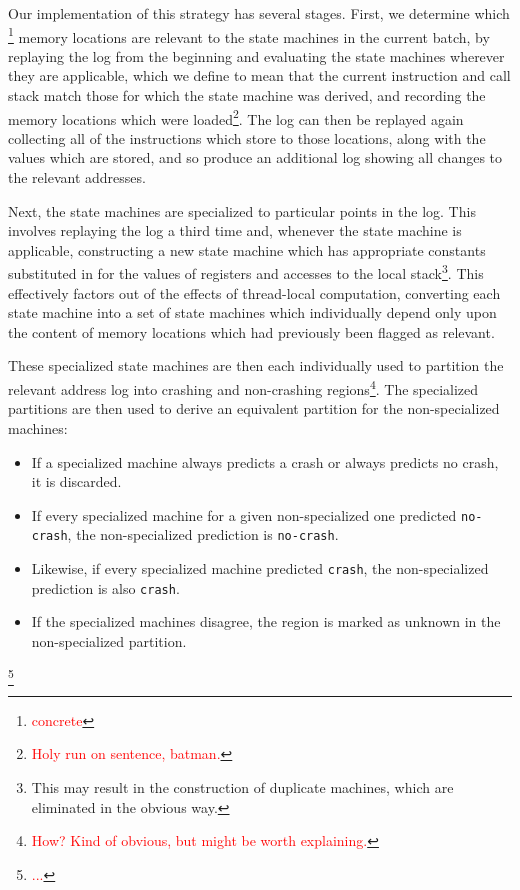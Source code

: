 \documentclass[10pt,twocolumn,preprint,natbib,authoryear]{sigplanconf}
\newcommand{\editorial}[1]{\textcolor{red}{\footnote{\textcolor{red}{#1}}}}
\begin{document}
Our implementation of this strategy has several stages.  First, we
determine which \editorial{concrete} memory locations are relevant to
the state machines in the current batch, by replaying the log from the
beginning and evaluating the state machines wherever they are
applicable, which we define to mean that the current instruction and
call stack match those for which the state machine was derived, and
recording the memory locations which were loaded\editorial{Holy run on
  sentence, batman.}.  The log can then be replayed again collecting
all of the instructions which store to those locations, along with the
values which are stored, and so produce an additional log showing all
changes to the relevant addresses.

Next, the state machines are specialized to particular points in the
log.  This involves replaying the log a third time and, whenever the
state machine is applicable, constructing a new state machine which
has appropriate constants substituted in for the values of registers
and accesses to the local stack\footnote{This may result in the
  construction of duplicate machines, which are eliminated in the
  obvious way.}.  This effectively factors out of the effects of
thread-local computation, converting each state machine into a set of
state machines which individually depend only upon the content of
memory locations which had previously been flagged as relevant.

These specialized state machines are then each individually used to
partition the relevant address log into crashing and non-crashing
regions\editorial{How?  Kind of obvious, but might be worth
  explaining.}. The specialized partitions are then used to derive an
equivalent partition for the non-specialized machines:

\begin{itemize}
\item If a specialized machine always predicts a crash or always
  predicts no crash, it is discarded.
\item If every specialized machine for a given non-specialized one
  predicted \verb|no-crash|, the non-specialized prediction is
  \verb|no-crash|.
\item Likewise, if every specialized machine predicted \verb|crash|,
  the non-specialized prediction is also \verb|crash|.
\item If the specialized machines disagree, the region is marked
  as unknown in the non-specialized partition.
\end{itemize}\editorial{...}
\end{document}
